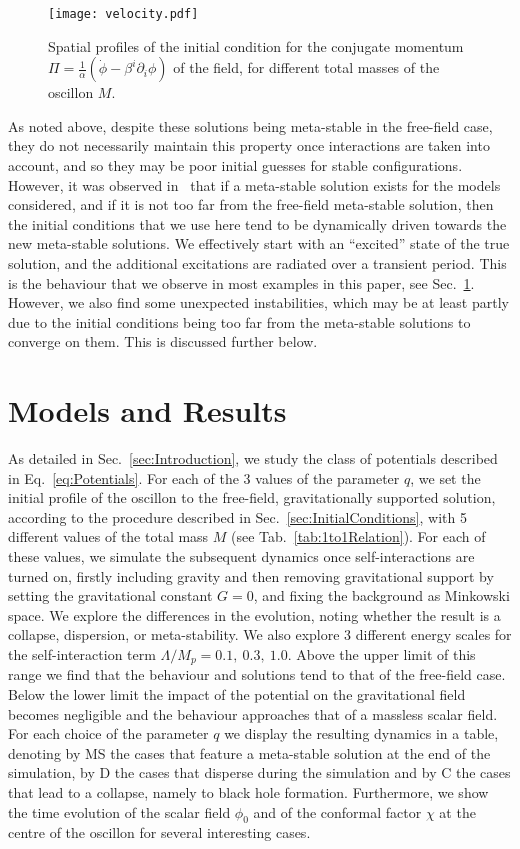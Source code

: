 \documentclass[11pt,a4paper]{article}
\begin{document}
\begin{figure}[h!]\centering
\texttt{[image: velocity.pdf]}
\caption{Spatial profiles of the initial condition for the conjugate momentum $\Pi = \frac{1}{\alpha}(\dot\phi - \beta^i \partial_i \phi)$ of the field, for different total masses of the oscillon $M$. \label{fig:pi}}
\end{figure}

As noted above, despite these solutions being meta-stable in the free-field case, they do not necessarily maintain this property once interactions are taken into account, and so they may be poor initial guesses for stable configurations. However, it was observed in~\cite{1906.09346} that if a meta-stable solution exists for the models considered, and if it is not too far from the free-field meta-stable solution, then the initial conditions that we use here tend to be dynamically driven towards the new meta-stable solutions. We effectively start with an ``excited'' state of the true solution, and the additional excitations are radiated over a transient period.
This is the behaviour that we observe in most examples in this paper, see Sec.~\ref{sec:ModelsAndResults}. However, we also find some unexpected instabilities, which may be at least partly due to the initial conditions being too far from the meta-stable solutions to converge on them. This is discussed further below.

\section{Models and Results}
\label{sec:ModelsAndResults}

As detailed in Sec.~\ref{sec:Introduction}, we study the class of potentials described in Eq.~\eqref{eq:Potentials}. For each of the 3 values of the parameter $q$, we set the initial profile of the oscillon to the free-field, gravitationally supported solution, according to the procedure described in Sec.~\ref{sec:InitialConditions}, with 5 different values of the total mass $M$ (see Tab.~\ref{tab:1to1Relation}). For each of these values, we simulate the subsequent dynamics once self-interactions are turned on, firstly including gravity and then removing gravitational support by setting the gravitational constant $G = 0$, and fixing the background as Minkowski space. We explore the differences in the evolution, noting whether the result is a collapse, dispersion, or meta-stability. 
We also explore 3 different energy scales for the self-interaction term $\Lambda/M_p = 0.1,~ 0.3,~ 1.0$. Above the upper limit of this range we find that the behaviour and solutions tend to that of the free-field case. Below the lower limit the impact of the potential on the gravitational field becomes negligible and the behaviour approaches that of a massless scalar field.
For each choice of the parameter $q$ we display the resulting dynamics in a table, denoting by MS the cases that feature a meta-stable solution at the end of the simulation, by D the cases that disperse during the simulation and by C the cases that lead to a collapse, namely to black hole formation. Furthermore, we show the time evolution of the scalar field $\phi_0$ and of the conformal factor $\chi$ at the centre of the oscillon for several interesting cases.
\end{document}
